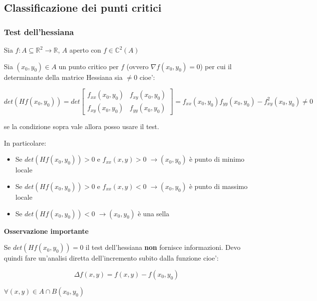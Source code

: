 \documentclass[../appunti-analisi.tex]{subfiles}
\begin{document}
\newpage


\subsection{Classificazione dei punti critici}

\subsubsection{Test dell'hessiana}

Sia $f: A \subseteq \mathbb{R}^{2} \rightarrow \mathbb{R}$, $A$ aperto con $f \in \mathbb{C}^{2}(A)$

Sia $(x_0,y_0) \in A$ un punto critico per $f$ (ovvero $\nabla f(x_0,y_0) = 0$) per cui il determinante della matrice Hessiana sia $\neq 0$ cioe':

\[
    det (Hf(x_0,y_0)) = det \begin{bmatrix}
    f_{xx}(x_0,y_0) & f_{xy}(x_0,y_0)\\
    f_{xy}(x_0,y_0) & f_{yy}(x_0,y_0)  
    \end{bmatrix} = f_{xx}(x_0,y_0) f_{yy}(x_0,y_0) - f_{xy}^{2}(x_0,y_0) \neq 0
\]

se la condizione sopra vale allora posso usare il test.

In particolare:

\begin{itemize}
    \item Se $det(Hf(x_0,y_0))>0$ e $f_{xx}(x,y)>0$  $\rightarrow (x_0,y_0)$ è punto di minimo locale
    \item Se $det(Hf(x_0,y_0))>0$ e $f_{xx}(x,y)<0$  $\rightarrow (x_0,y_0)$ è punto di massimo locale
    \item Se $det(Hf(x_0,y_0))<0$ $\rightarrow (x_0,y_0)$ è una sella
\end{itemize}

\textbf{Osservazione importante} 

Se $det(Hf(x_0,y_0)) =0$ il test dell'hessiana \textbf{non} fornisce informazioni. Devo quindi fare un'analisi diretta dell'incremento subito dalla funzione cioe':

\[
  \Delta f(x,y) = f(x,y)-f(x_0,y_0)
\]

$\forall (x,y) \in A \cap B(x_0,y_0)$
\end{document}
